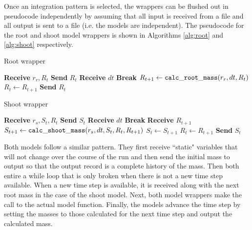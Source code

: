 \documentclass[journal]{IEEEtran}
\begin{document}
Once an integration pattern is selected, the wrappers can be flushed out in pseudocode independently by assuming that all input is received from a file and all output is sent to a file (i.e. the models are independent). The pseudocode for the root and shoot model wrappers is shown in Algorithms \ref{alg:root} and \ref{alg:shoot} respectively.
%
\begin{algorithm}[H]
    \caption{Root wrapper}
    \label{alg:root}
    \begin{algorithmic}[1] 
    \State \textbf{Receive} $r_r, R_t$
    \State \textbf{Send} $R_{t}$ 
        		\State \textbf{Receive} $dt$
	\Else
		\State \textbf{Break}
	\EndIf
    	\State $R_{t+1} \gets {\tt calc\_root\_mass}(r_r, dt, R_t)$
	\State $R_t \gets R_{t+1}$
	\State \textbf{Send} $R_{t}$
    \EndWhile
    \end{algorithmic}
\end{algorithm}
%
\begin{algorithm}[H]
    \caption{Shoot wrapper}
    \label{alg:shoot}
    \begin{algorithmic}[1] 
    \State \textbf{Receive} $r_s, S_t, R_t$
    \State \textbf{Send} $S_{t}$ 
        		\State \textbf{Receive} $dt$
	\Else
		\State \textbf{Break}
	\EndIf
	\State \textbf{Receive} $R_{t+1}$
	\State $S_{t+1} \gets {\tt calc\_shoot\_mass}(r_s, dt, S_t, R_t, R_{t+1})$
	\State $S_t \gets S_{t+1}$
	\State $R_t \gets R_{t+1}$
	\State \textbf{Send} $S_{t}$
    \EndWhile
    \end{algorithmic}
\end{algorithm}
%
Both models follow a similar pattern. They first receive ``static" variables that will not change over the course of the run and then send the initial mass to output so that the output record is a complete history of the mass. Then both entire a while loop that is only broken when there is not a new time step available. When a new time step is available, it is received along with the next root mass in the case of the shoot model. Next, both model wrappers make the call to the actual model function. Finally, the models advance the time step by setting the masses to those calculated for the next time step and output the calculated mass.
\end{document}
